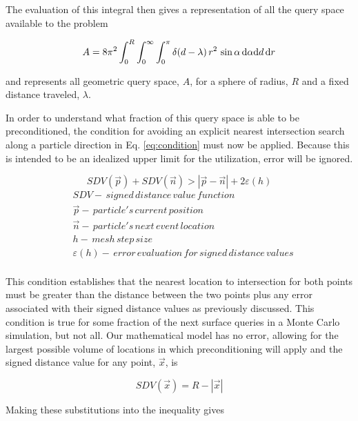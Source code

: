 The evaluation of this integral then gives a representation of all the query
space available to the problem

\begin{equation}
  \label{eq:A_fixed}
\small A = 8\pi^2  \int_{0}^{R}\int_{0}^{\infty}\int_{0}^{\pi} \delta(d-\lambda) \,
r^2 \, \sin{\alpha} \, \mathrm{d}\alpha \mathrm{d}d \, \mathrm{d}r
\end{equation}

and represents all geometric query space, $A$, for a sphere of radius,
$R$ and a fixed distance traveled, $\lambda$.

In order to understand what fraction of this query space is able to be
preconditioned, the condition for avoiding an explicit nearest intersection
search along a particle direction in Eq. \ref{eq:condition} must now be
applied. Because this is intended to be an idealized upper limit for the
utilization, error will be ignored.

\begin{equation}
  SDV(\vec{p}) + SDV(\vec{n}) > |\vec{p}-\vec{n}| + 2\varepsilon(h)
  \label{eq:condition}
\end{equation}
\begin{align*}
 &SDV - \, signed \, distance \, value \, function \\
 &\vec{p} - \, particle's \, current \, position \\
 &\vec{n} - \, particle's \, next \, event \, location \\
 &h - \, mesh \, step \, size \\
 &\varepsilon(h) - \, error \, evaluation \, for \, signed \, distance \, values \\
\end{align*}

This condition establishes that the nearest location to intersection for both
points must be greater than the distance between the two points plus any error
associated with their signed distance values as previously discussed. This
condition is true for some fraction of the next surface queries in a Monte Carlo
simulation, but not all.  Our mathematical model has no error, allowing for the
largest possible volume of locations in which preconditioning will apply and the
signed distance value for any point, $\vec{x}$, is

\begin{equation}
SDV(\vec{x}) =  R-|\vec{x}|
\end{equation}

Making these substitutions into the inequality gives

